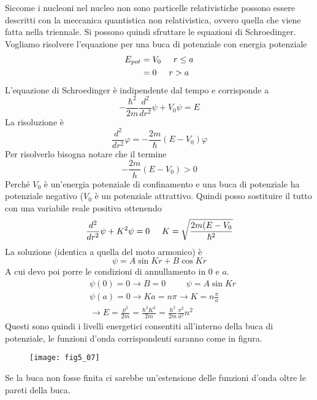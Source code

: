 Siccome i nucleoni nel nucleo non sono particelle relativistiche possono essere descritti con la meccanica quantistica non relativistica, ovvero quella che viene fatta nella triennale.
Si possono quindi sfruttare le equazioni di Schroedinger.
Vogliamo risolvere l'equazione per una buca di potenziale con energia potenziale
\begin{equation}
\begin{split}
E_{pot} &=V_0\hspace{0.5cm}r\leq a\\
&=0\hspace{0.5cm}r>a
\end{split}
\end{equation}
L'equazione di Schroedinger è indipendente dal tempo e corrisponde a
\begin{equation}
-\frac{\hbar^2}{2m}\frac{d^2}{dr^2}\psi+V_0\psi=E
\end{equation}
La risoluzione è
\begin{equation}
\frac{d^2}{dr^2}\varphi=-\frac{2m}{\hbar}(E-V_0)\varphi
\end{equation}
Per risolverlo bisogna notare che il termine 
\[
-\frac{2m}{h}(E-V_0)>0
\]
Perché $V_0$ è un'energia potenziale di confinamento e una buca di potenziale ha potenziale negativo ($V_0$ è un potenziale attrattivo. 
Quindi posso sostituire il tutto con una variabile reale positiva ottenendo
\begin{equation}
\frac{d^2}{dr^2}\psi+K^2\psi=0 \hspace{0.5cm} K=\sqrt{\frac{2m(E-V_0}{\hbar^2}}
\end{equation}
La soluzione (identica a quella del moto armonico) è
\begin{equation}
\psi=A\sin Kr+B\cos Kr
\end{equation}
A cui devo poi porre le condizioni di annullamento in $0$ e $a$.
\begin{equation}
\begin{split}
&\psi(0)=0\to B=0\hspace{1cm}\psi=A \sin Kr\\
&\psi(a)=0\to Ka=n\pi \to K=n\frac{\pi}{a}\\
&\to E=\frac{p^2}{2m}=\frac{\hbar^2K^2}{2m}=\frac{\hbar^2}{2m}\frac{\pi^2}{a^2}n^2
\end{split}
\end{equation}
Questi sono quindi i livelli energetici consentiti all'interno della buca di potenziale, le funzioni d'onda corrispondenti saranno come in figura.
\begin{figure}[h]
\centering
\texttt{[image: fig5\_07]}
\end{figure}
Se la buca non fosse finita ci sarebbe un'estensione delle funzioni d'onda oltre le pareti della buca.

